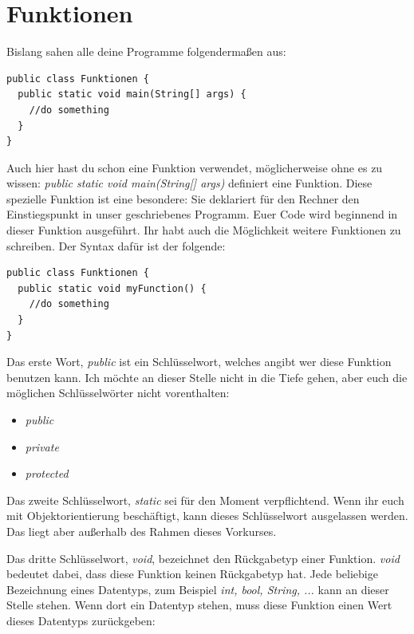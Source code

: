 \chapter{Funktionen}

Bislang sahen alle deine Programme folgendermaßen aus:

\begin{minipage}{\textwidth}
\begin{lstlisting}
public class Funktionen {
  public static void main(String[] args) {
    //do something
  }
}
\end{lstlisting}
\end{minipage}

Auch hier hast du schon eine Funktion verwendet, möglicherweise ohne es zu wissen: \textit{public static void main(String[] args)} definiert eine Funktion. Diese spezielle Funktion ist eine besondere: Sie deklariert für den Rechner den Einstiegspunkt in unser geschriebenes Programm. Euer Code wird beginnend in dieser Funktion ausgeführt. Ihr habt auch die Möglichkeit weitere Funktionen zu schreiben. Der Syntax dafür ist der folgende:

\begin{minipage}{\textwidth}
\begin{lstlisting}
public class Funktionen {
  public static void myFunction() {
    //do something
  }
}
\end{lstlisting}
\end{minipage}

Das erste Wort, \textit{public} ist ein Schlüsselwort, welches angibt wer diese Funktion benutzen kann. Ich möchte an dieser Stelle nicht in die Tiefe gehen, aber euch die möglichen Schlüsselwörter nicht vorenthalten:

\begin{itemize}
	\item \textit{public}
	\item \textit{private}
	\item \textit{protected}
\end{itemize}

Das zweite Schlüsselwort, \textit{static} sei für den Moment verpflichtend. Wenn ihr euch mit Objektorientierung beschäftigt, kann dieses Schlüsselwort ausgelassen werden. Das liegt aber außerhalb des Rahmen dieses Vorkurses.

Das dritte Schlüsselwort, \textit{void}, bezeichnet den Rückgabetyp einer Funktion. \textit{void} bedeutet dabei, dass diese Funktion keinen Rückgabetyp hat. Jede beliebige Bezeichnung eines Datentyps, zum Beispiel \textit{int, bool, String, ...} kann an dieser Stelle stehen. Wenn dort ein Datentyp stehen, muss diese Funktion einen Wert dieses Datentyps zurückgeben:

